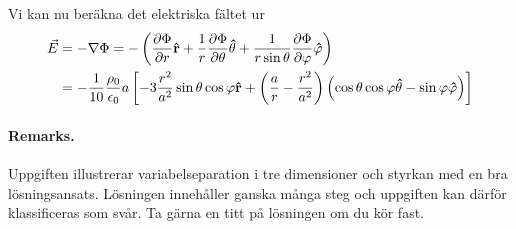 \documentclass[%
oneside,                 %
final,                   %
10pt]{article}
\newenvironment{doconceexercise}{}{}
\begin{document}
\begin{doconceexercise}
Vi kan nu beräkna det elektriska fältet ur
\begin{align}
  \vec{E} &= - \nabla \Phi = - \left(\frac{\partial \Phi}{\partial r} 
{\bf \hat r} + \frac{1}{r} \frac{\partial \Phi}{\partial \theta} 
{\bf \hat \theta} + \frac{1}{r \sin \theta} 
\frac{\partial \Phi}{\partial \varphi} {\bf \hat \varphi}\right)
\nonumber \\
&= - \frac{1}{10}\frac{\rho_0}{\epsilon_0} a \left[-3 \frac{r^2}{a^2} \sin \theta
\cos \varphi {\bf \hat r} + \left(\frac{a}{r} - \frac{r^2}{a^2}\right) \left(
\cos \theta \cos \varphi {\bf \hat \theta} - \sin \varphi {\bf \hat \varphi}
\right) \right]
\end{align}



\paragraph{Remarks.}
Uppgiften illustrerar variabelseparation i tre dimensioner och styrkan med en bra lösningsansats. Lösningen innehåller ganska många steg och uppgiften kan därför klassificeras som svår. Ta gärna en titt på lösningen om du kör fast.


\end{doconceexercise}


\end{document}

